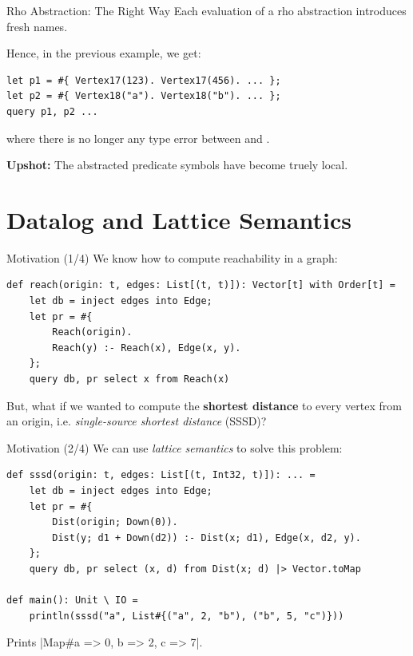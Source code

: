 \begin{frame}[fragile]{Rho Abstraction: The Right Way}
Each evaluation of a rho abstraction introduces fresh names.

Hence, in the previous example, we get:

\begin{lstlisting}[language=flix, xleftmargin=0.8cm]
let p1 = #{ Vertex17(123). Vertex17(456). ... };
let p2 = #{ Vertex18("a"). Vertex18("b"). ... };
query p1, p2 ...
\end{lstlisting}

where there is no longer any type error between  and .

\pause

\textbf{Upshot:} The abstracted predicate symbols have become truely local.
\end{frame}

\section{Datalog and Lattice Semantics}

\begin{frame}[fragile]{Motivation (1/4)}
We know how to compute reachability in a graph:

\begin{lstlisting}[language=flix, xleftmargin=0.8cm]
def reach(origin: t, edges: List[(t, t)]): Vector[t] with Order[t] = 
    let db = inject edges into Edge;
    let pr = #{
        Reach(origin).
        Reach(y) :- Reach(x), Edge(x, y).
    };
    query db, pr select x from Reach(x)
\end{lstlisting}

\pause

But, what if we wanted to compute the \textbf{shortest distance} to every vertex
from an origin, i.e. \emph{single-source shortest distance} (SSSD)?
\end{frame}

\begin{frame}[fragile]{Motivation (2/4)}
We can use \emph{lattice semantics} to solve this problem:

\begin{lstlisting}[language=flix, xleftmargin=0.8cm]
def sssd(origin: t, edges: List[(t, Int32, t)]): ... = 
    let db = inject edges into Edge;
    let pr = #{
        Dist(origin; Down(0)).
        Dist(y; d1 + Down(d2)) :- Dist(x; d1), Edge(x, d2, y).
    };
    query db, pr select (x, d) from Dist(x; d) |> Vector.toMap

def main(): Unit \ IO = 
    println(sssd("a", List#{("a", 2, "b"), ("b", 5, "c")}))
\end{lstlisting}

Prints \Code|Map#{a => 0, b => 2, c => 7}|.
\end{frame}

